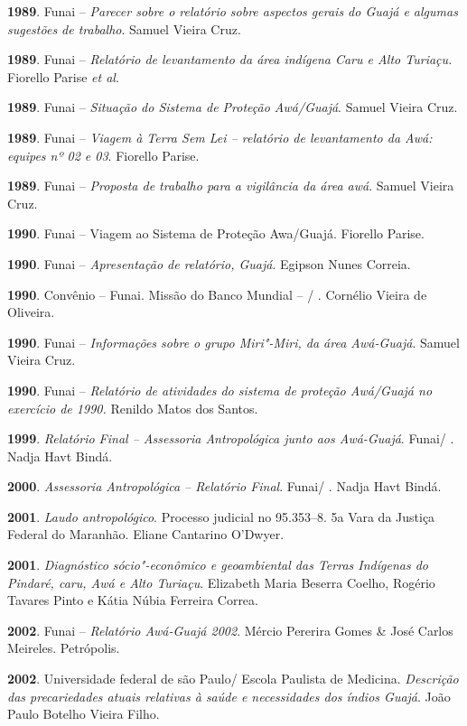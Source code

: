 \textbf{1989}. Funai -- \emph{Parecer sobre o relatório sobre aspectos
gerais do  Guajá e algumas sugestões de trabalho}. Samuel Vieira
Cruz.

\textbf{1989}. Funai -- \emph{Relatório de levantamento da área indígena
Caru e Alto Turiaçu.} Fiorello Parise \emph{et al}.

\textbf{1989}. Funai -- \emph{Situação do Sistema de Proteção
Awá/Guajá}. Samuel Vieira Cruz.

\textbf{1989}. Funai -- \emph{Viagem à Terra Sem Lei -- relatório de
levantamento da  Awá: equipes nº 02 e 03}. Fiorello Parise.

\textbf{1989}. Funai -- \emph{Proposta de trabalho para a vigilância da
área awá}. Samuel Vieira Cruz.

\textbf{1990}. Funai -- Viagem ao Sistema de Proteção Awa/Guajá.
Fiorello Parise.

\textbf{1990}. Funai -- \emph{Apresentação de relatório,  Guajá}.
Egipson Nunes Correia.

\textbf{1990}. Convênio  -- Funai. Missão do Banco Mundial -- /
. Cornélio Vieira de Oliveira.

\textbf{1990}. Funai -- \emph{Informações sobre o grupo Miri"-Miri, da
área Awá-Guajá}. Samuel Vieira Cruz.

\textbf{1990}. Funai -- \emph{Relatório de atividades do sistema de
proteção Awá/Guajá no exercício de 1990.} Renildo Matos dos Santos.

\textbf{1999}. \emph{Relatório Final -- Assessoria Antropológica junto aos
Awá-Guajá}. Funai/ . Nadja Havt Bindá.

\textbf{2000}. \emph{Assessoria Antropológica -- Relatório Final}. Funai/
. Nadja Havt Bindá.

\textbf{2001}. \emph{Laudo antropológico}. Processo judicial no
95.353--8. 5a Vara da Justiça Federal do Maranhão. Eliane Cantarino
O'Dwyer.

\textbf{2001}. \emph{Diagnóstico sócio"-econômico e geoambiental das
Terras Indígenas do Pindaré, caru, Awá e Alto Turiaçu}. Elizabeth Maria
Beserra Coelho, Rogério Tavares Pinto e Kátia Núbia Ferreira Correa.

\textbf{2002}. Funai -- \emph{Relatório Awá-Guajá 2002}. Mércio Pererira
Gomes \& José Carlos Meireles. Petrópolis.

\textbf{2002}. Universidade federal de são Paulo/ Escola Paulista de
Medicina. \emph{Descrição das precariedades atuais relativas à saúde e
necessidades dos índios Guajá}. João Paulo Botelho Vieira Filho.

